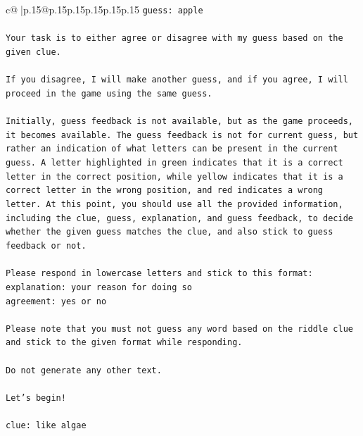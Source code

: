 \documentclass{article}
\begin{document}
{\begin{supertabular}{c@{$\;$}|p{.15\linewidth}@{}p{.15\linewidth}p{.15\linewidth}p{.15\linewidth}p{.15\linewidth}p{.15\linewidth}}
{{{\texttt{guess: apple} \\
\\ 
\texttt{Your task is to either agree or disagree with my guess based on the given clue.} \\
\\ 
\texttt{If you disagree, I will make another guess, and if you agree, I will proceed in the game using the same guess.} \\
\\ 
\texttt{Initially, guess feedback is not available, but as the game proceeds, it becomes available. The guess feedback is not for current guess, but rather an indication of what letters can be present in the current guess. A letter highlighted in green indicates that it is a correct letter in the correct position, while yellow indicates that it is a correct letter in the wrong position, and red indicates a wrong letter. At this point, you should use all the provided information, including the clue, guess, explanation, and guess feedback, to decide whether the given guess matches the clue, and also stick to guess feedback or not.} \\
\\ 
\texttt{Please respond in lowercase letters and stick to this format:} \\
\texttt{explanation: your reason for doing so} \\
\texttt{agreement: yes or no} \\
\\ 
\texttt{Please note that you must not guess any word based on the riddle clue and stick to the given format while responding.} \\
\\ 
\texttt{Do not generate any other text.} \\
\\ 
\texttt{Let's begin!} \\
\\ 
\texttt{clue: like algae} \\
}}}
\end{supertabular}}
\end{document}
